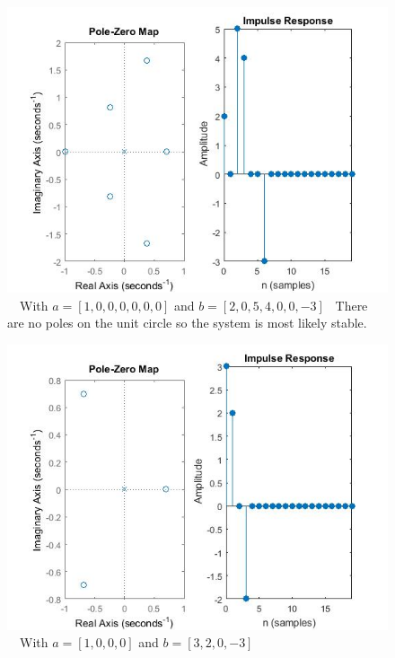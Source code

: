 \documentclass{article}
\begin{document}
\begin{figure}[H]

\includegraphics[scale = .5]{report5_1} \
\ With $a = [1,0,0,0,0,0,0]$ and $b =[2,0,5,4,0,0,-3]$
\ There are no poles on the unit circle so the system is most likely stable.
\end{figure}

\begin{figure}[H]
\includegraphics[scale = .5]{report5_2} \
\ With $a = [1,0,0,0]$ and $b = [3,2,0,-3]$
\end{figure}
\end{document}

